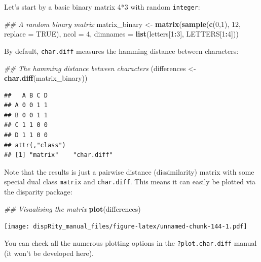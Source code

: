 \documentclass[
]{book}
\newenvironment{Shaded}{\begin{snugshade}}{\end{snugshade}}
\newcommand{\CommentTok}[1]{\textcolor[rgb]{0.56,0.35,0.01}{\textit{#1}}}
\newcommand{\DataTypeTok}[1]{\textcolor[rgb]{0.13,0.29,0.53}{#1}}
\newcommand{\DecValTok}[1]{\textcolor[rgb]{0.00,0.00,0.81}{#1}}
\newcommand{\KeywordTok}[1]{\textcolor[rgb]{0.13,0.29,0.53}{\textbf{#1}}}
\newcommand{\NormalTok}[1]{#1}
\newcommand{\OperatorTok}[1]{\textcolor[rgb]{0.81,0.36,0.00}{\textbf{#1}}}
\newcommand{\OtherTok}[1]{\textcolor[rgb]{0.56,0.35,0.01}{#1}}
\newcommand{\StringTok}[1]{\textcolor[rgb]{0.31,0.60,0.02}{#1}}
\begin{document}
Let's start by a basic binary matrix 4*3 with random \texttt{integer}:

\begin{Shaded}
\begin{Highlighting}[]
\CommentTok{\#\# A random binary matrix}
\NormalTok{matrix\_binary \textless{}{-}}\StringTok{ }\KeywordTok{matrix}\NormalTok{(}\KeywordTok{sample}\NormalTok{(}\KeywordTok{c}\NormalTok{(}\DecValTok{0}\NormalTok{,}\DecValTok{1}\NormalTok{), }\DecValTok{12}\NormalTok{, }\DataTypeTok{replace =} \OtherTok{TRUE}\NormalTok{), }\DataTypeTok{ncol =} \DecValTok{4}\NormalTok{,}
                        \DataTypeTok{dimnames =} \KeywordTok{list}\NormalTok{(letters[}\DecValTok{1}\OperatorTok{:}\DecValTok{3}\NormalTok{], LETTERS[}\DecValTok{1}\OperatorTok{:}\DecValTok{4}\NormalTok{]))}
\end{Highlighting}
\end{Shaded}

By default, \texttt{char.diff} measures the hamming distance between characters:

\begin{Shaded}
\begin{Highlighting}[]
\CommentTok{\#\# The hamming distance between characters}
\NormalTok{(differences \textless{}{-}}\StringTok{ }\KeywordTok{char.diff}\NormalTok{(matrix\_binary))}
\end{Highlighting}
\end{Shaded}

\begin{verbatim}
##   A B C D
## A 0 0 1 1
## B 0 0 1 1
## C 1 1 0 0
## D 1 1 0 0
## attr(,"class")
## [1] "matrix"    "char.diff"
\end{verbatim}

Note that the results is just a pairwise distance (dissimilarity) matrix with some special dual class \texttt{matrix} and \texttt{char.diff}.
This means it can easily be plotted via the disparity package:

\begin{Shaded}
\begin{Highlighting}[]
\CommentTok{\#\# Visualising the matrix}
\KeywordTok{plot}\NormalTok{(differences)}
\end{Highlighting}
\end{Shaded}

\texttt{[image: dispRity\_manual\_files/figure-latex/unnamed-chunk-144-1.pdf]}

You can check all the numerous plotting options in the \texttt{?plot.char.diff} manual (it won't be developed here).
\end{document}
